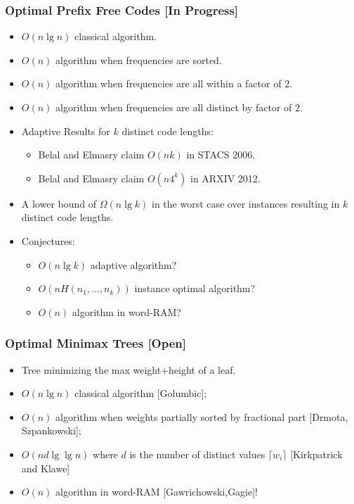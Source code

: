\documentclass{beamer}
\begin{document}
\begin{frame}
  \frametitle{Optimal Prefix Free Codes [In Progress]}
  \begin{itemize}
  \item $O(n\lg n)$ classical algorithm.
  \item $O(n)$ algorithm when frequencies are sorted.
  \item $O(n)$ algorithm when frequencies are all within a factor of $2$.
  \item $O(n)$ algorithm when frequencies are all distinct by factor of $2$.
  \item Adaptive Results for $k$ distinct code lengths:
    \begin{itemize}
     \item Belal and Elmasry claim $O(nk)$ in STACS 2006. 
     \item Belal and Elmasry claim $O(n 4^k)$ in ARXIV 2012.
     \end{itemize}
  \item A lower bound of $\Omega(n\lg k)$ in the worst case over
  instances resulting in $k$ distinct code lengths.
\item Conjectures:
  \begin{itemize}
  \item $O(n\lg k)$ adaptive algorithm?
  \item $O(nH(n_1,\ldots,n_k))$ instance optimal algorithm?
  \item $O(n)$ algorithm in word-RAM?
  \end{itemize}
  \end{itemize}
\end{frame}

\begin{frame}
  \frametitle{Optimal Minimax Trees [Open]}
  \begin{itemize}
  \item Tree minimizing the max weight+height of a leaf.
  \item $O(n\lg n)$ classical algorithm [Golumbic];
  \item $O(n)$ algorithm when weights partially sorted by fractional part [Drmota, Szpankowski];
  \item $O(nd\lg\lg n)$ where $d$ is the number of distinct values
    $\lceil w_i\rceil$ [Kirkpatrick and Klawe]
  \item $O(n)$ algorithm in word-RAM [Gawrichowski,Gagie]!
  \end{itemize}
\end{frame}
\end{document}
